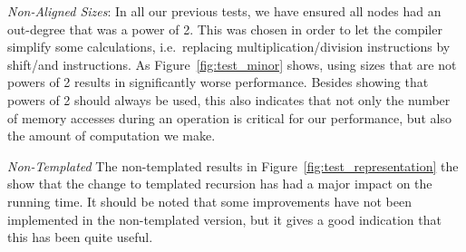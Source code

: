 \textit{Non-Aligned Sizes}: In all our previous tests, we have ensured all
nodes had an out-degree that was a power of 2. This was chosen in order to let the
compiler simplify some calculations, i.e.\ replacing multiplication/division
instructions by shift/and instructions. As Figure~\ref{fig:test_minor} shows,
using sizes that are not powers of 2 results in significantly worse performance.
Besides showing that powers of 2 should always be used, this also indicates that not only
the number of memory accesses during an operation is critical for our
performance, but also the amount of computation we make.

\textit{Non-Templated}
The non-templated results 
in Figure~\ref{fig:test_representation} the
show that the change to templated recursion
has had a major impact on the running time. It should be noted that some
improvements have not been implemented in the non-templated version,
but it gives a good indication that this has been quite useful.
